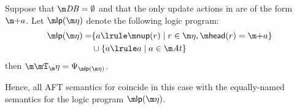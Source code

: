   


\begin{proposition}\label{prop:lplink}
  Suppose that $\db=\emptyset$ and that the only update actions in \aics are of the form $\add a$.
  Let $\lpop(\aics)$ denote the following logic program:  
 \begin{align*}
  \lpop(\aics)=& \{a \lrule \nup(r)\mid r\in \aics, \head(r)= \add a\}\\
  &\cup \{a \lrule a\mid a \in \atoms\}
 \end{align*}
 then $\Ap = \Psi_{\lpop(\aics)}$. 

Hence, all AFT semantics for \fulldb coincide in this case with the equally-named semantics for the logic program $\lpop(\aics)$. 
\end{proposition}
